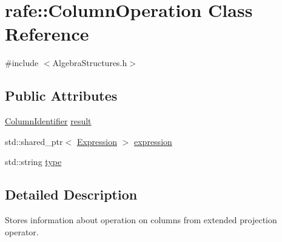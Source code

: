 \hypertarget{classrafe_1_1_column_operation}{\section{rafe\+:\+:Column\+Operation Class Reference}
\label{classrafe_1_1_column_operation}
}


{\ttfamily \#include $<$Algebra\+Structures.\+h$>$}

\subsection*{Public Attributes}
\begin{DoxyCompactItemize}
\item 
\hyperlink{classrafe_1_1_column_identifier}{Column\+Identifier} \hyperlink{classrafe_1_1_column_operation_a728c264bef7363a5bf0578c49654ea3b}{result}
\item 
std\+::shared\+\_\+ptr$<$ \hyperlink{classrafe_1_1_expression}{Expression} $>$ \hyperlink{classrafe_1_1_column_operation_a33bfeb4554709f96d9945cb2148f095b}{expression}
\item 
std\+::string \hyperlink{classrafe_1_1_column_operation_a1c85fd1a1f9465b33553cbdd6e641a51}{type}
\end{DoxyCompactItemize}


\subsection{Detailed Description}
Stores information about operation on columns from extended projection operator. 

